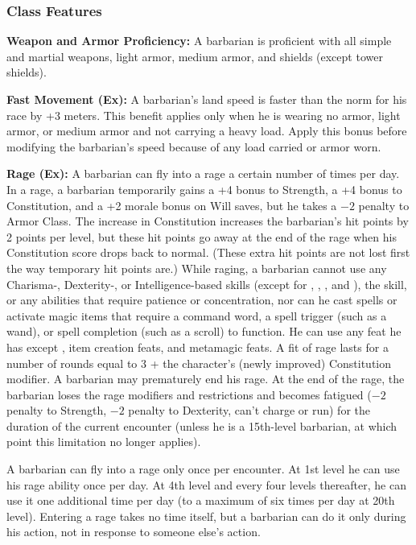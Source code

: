 \subsubsection{Class Features}

\textbf{Weapon and Armor Proficiency:} A barbarian is proficient with all simple and martial weapons, light armor, medium armor, and shields (except tower shields).

\textbf{Fast Movement (Ex):} A barbarian's land speed is faster than the norm for his race by +3 meters. This benefit applies only when he is wearing no armor, light armor, or medium armor and not carrying a heavy load. Apply this bonus before modifying the barbarian's speed because of any load carried or armor worn.

\textbf{Rage (Ex):} A barbarian can fly into a rage a certain number of times per day. In a rage, a barbarian temporarily gains a +4 bonus to Strength, a +4 bonus to Constitution, and a +2 morale bonus on Will saves, but he takes a $-2$ penalty to Armor Class. The increase in Constitution increases the barbarian's hit points by 2 points per level, but these hit points go away at the end of the rage when his Constitution  score drops back to normal. (These extra hit points are not lost first the way temporary hit points are.) While raging, a barbarian cannot use any Charisma-, Dexterity-, or Intelligence-based skills (except for , , , and ), the  skill, or any abilities that require patience or concentration, nor can he cast spells or activate magic items that require a command word, a spell trigger (such as a wand), or spell completion (such as a scroll) to function. He can use any feat he has except , item creation feats, and metamagic feats. A fit of rage lasts for a number of rounds equal to 3 + the character's (newly improved) Constitution modifier. A barbarian may prematurely end his rage. At the end of the rage, the barbarian loses the rage modifiers and restrictions and becomes fatigued ($-2$ penalty to Strength, $-2$ penalty to Dexterity, can't charge or run) for the duration of the current encounter (unless he is a 15th-level barbarian, at which point this limitation no longer applies).

A barbarian can fly into a rage only once per encounter. At 1st level he can use his rage ability once per day. At 4th level and every four levels thereafter, he can use it one additional time per day (to a maximum of six times per day at 20th level). Entering a rage takes no time itself, but a barbarian can do it only during his action, not in response to someone else's action. 

